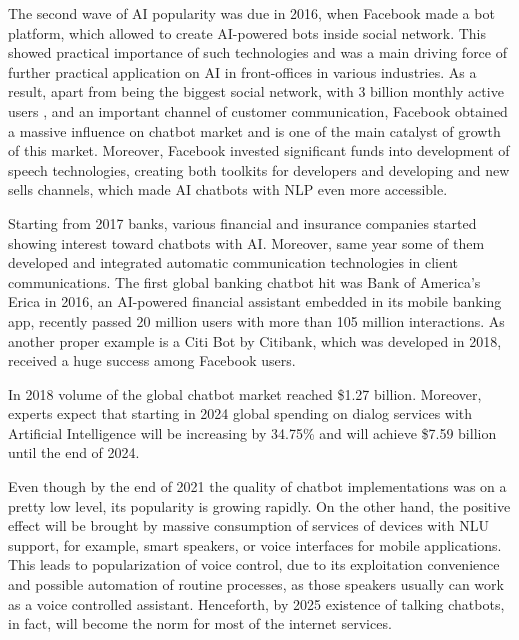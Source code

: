 The second wave of AI popularity was due in 2016, when Facebook made a bot platform, which allowed to create AI-powered bots inside social network.
This showed practical importance of such technologies and was a main driving force of further practical application on AI in front-offices in various industries.
As a result, apart from being the biggest social network, with 3 billion monthly active users \cite{facebook_statistic}, and an important channel of customer communication, Facebook obtained a massive influence on chatbot market and is one of the main catalyst of growth of this market.
Moreover, Facebook invested significant funds into development of speech technologies, creating both toolkits for developers and developing and new sells channels, which made AI chatbots with NLP even more accessible.

Starting from 2017 banks, various financial and insurance companies started showing interest toward chatbots with AI.
Moreover, same year some of them developed and integrated automatic communication technologies in client communications.
The first global banking chatbot hit was Bank of America's Erica in 2016, an AI-powered financial assistant embedded in its mobile banking app, recently passed 20 million users with more than 105 million interactions.
As another proper example is a Citi Bot by Citibank, which was developed in 2018, received a huge success among Facebook users.

In 2018 volume of the global chatbot market reached \$1.27 billion.
Moreover, experts expect that starting in 2024 global spending on dialog services with Artificial Intelligence will be increasing by 34.75\% and will achieve \$7.59 billion until the end of 2024.
\cite{gartner_chat_bots}

Even though by the end of 2021 the quality of chatbot implementations was on a pretty low level, its popularity is growing rapidly.
On the other hand, the positive effect will be brought by massive consumption of services of devices with NLU support, for example, smart speakers, or voice interfaces for mobile applications.
This leads to popularization of voice control, due to its exploitation convenience and possible automation of routine processes, as those speakers usually can work as a voice controlled assistant.
Henceforth, by 2025 existence of talking chatbots, in fact, will become the norm for most of the internet services.
\cite{accenture_chatbots}

